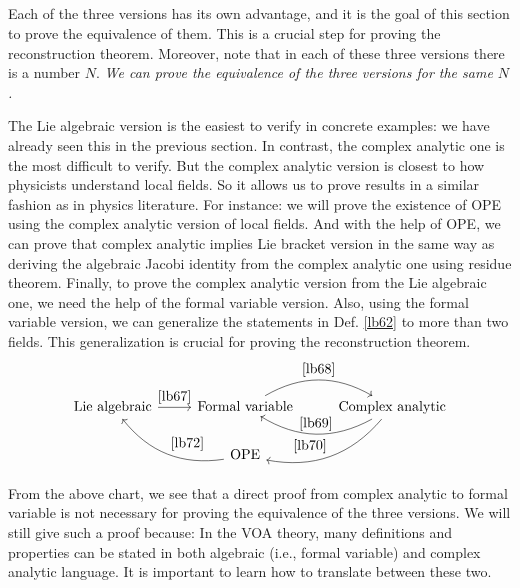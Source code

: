 \documentclass[11pt,b5paper,notitlepage]{article}
\theoremstyle{definition}
\theoremstyle{plain}
\numberwithin{equation}{section}
\begin{document}
\subsection{}


Each of the three versions has its own advantage, and it is the goal of this section to prove the equivalence of them. This is a crucial step for proving the reconstruction theorem. Moreover, note that in each of these three versions there is a number $N$. \emph{We can prove the  equivalence of the three versions for the same $N$.}

The Lie algebraic version is the easiest to verify in concrete examples: we have already seen this in the previous section. In contrast, the complex analytic one is the most difficult to verify. But the complex analytic version is closest to how physicists understand local fields. So it allows us to prove results in a similar fashion as in physics literature. For instance: we will prove the existence of OPE using the complex analytic version of local fields. And with the help of OPE, we can prove that complex analytic implies Lie bracket version in the same way as deriving the algebraic Jacobi identity from the complex analytic one using residue theorem. Finally, to prove the complex analytic version from the Lie algebraic one, we need the help of the formal variable version. Also, using the formal variable version, we can generalize the statements in Def. \ref{lb62} to more than two fields. This generalization is crucial for proving the reconstruction theorem.
\begin{equation*}
\begin{tikzcd}
	\text{Lie algebraic} \arrow[r,"\ref{lb67}"] & \text{Formal variable} \arrow[r, bend left,"\ref{lb68}"] & \text{Complex analytic} \arrow[l, bend left,"\ref{lb69}"'] \arrow[ld, bend left,"\ref{lb70}"'] \\
	& \text{OPE} \arrow[lu, bend left,"\ref{lb72}"']             &                                                                    
\end{tikzcd}
\end{equation*}

From the above chart, we see that a direct proof from complex analytic to formal variable is not necessary for proving the equivalence of the three versions. We will still give such a proof because: In the VOA theory,  many definitions and properties can be stated in both algebraic (i.e., formal variable)  and complex analytic language. It is important to learn how to translate between these two. 
\end{document}
